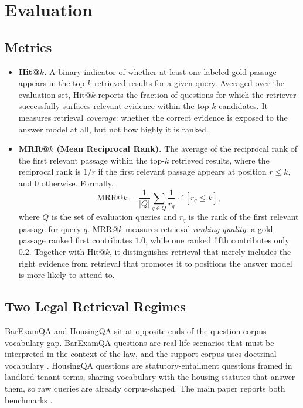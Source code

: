 \section{Evaluation}\label{sec:experiment}


\subsection{Metrics}
\begin{itemize}
    \item \textbf{Hit@$k$.} A binary indicator of whether at least one labeled gold passage appears in the top-$k$ retrieved results for a given query. Averaged over the evaluation set, Hit@$k$ reports the fraction of questions for which the retriever successfully surfaces relevant evidence within the top $k$ candidates. It measures retrieval \emph{coverage}: whether the correct evidence is exposed to the answer model at all, but not how highly it is ranked.
    
    \item \textbf{MRR@$k$ (Mean Reciprocal Rank).} The average of the reciprocal rank of the first relevant passage within the top-$k$ retrieved results, where the reciprocal rank is $1/r$ if the first relevant passage appears at position $r \leq k$, and $0$ otherwise. Formally,
    \begin{equation}
        \text{MRR@}k = \frac{1}{|Q|} \sum_{q \in Q} \frac{1}{r_q} \cdot \mathbb{1}[r_q \leq k],
    \end{equation}
    where $Q$ is the set of evaluation queries and $r_q$ is the rank of the first relevant passage for query $q$. MRR@$k$ measures retrieval \emph{ranking quality}: a gold passage ranked first contributes $1.0$, while one ranked fifth contributes only $0.2$. Together with Hit@$k$, it distinguishes retrieval that merely includes the right evidence from retrieval that promotes it to positions the answer model is more likely to attend to.
\end{itemize}

\subsection{Two Legal Retrieval Regimes}

BarExamQA and HousingQA sit at opposite ends of the question-corpus
vocabulary gap. BarExamQA questions are real life scenarios that must be interpreted in the context of the law, and the support corpus uses doctrinal vocabulary \cite{Zheng_2025}. HousingQA questions are
statutory-entailment questions framed in landlord-tenant terms, sharing
vocabulary with the housing statutes that answer them, so raw queries are
already corpus-shaped. The main paper reports both benchmarks \cite{Zheng_2025}.

